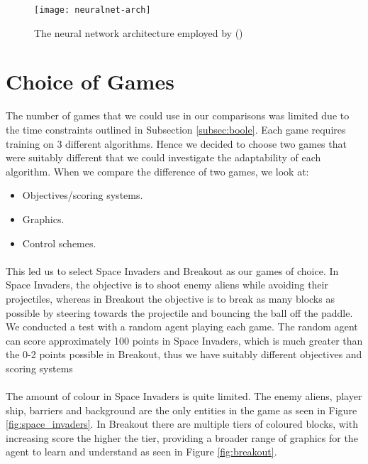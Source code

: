\begin{figure}[h]
    \centering
    \texttt{[image: neuralnet-arch]}
    \caption{The neural network architecture employed by (\citet{human})}
    \label{fig:nnarch}
\end{figure}

\section{Choice of Games} \label{sec:games}
The number of games that we could use in our comparisons was limited due to the time constraints outlined in Subsection \ref{subsec:boole}. Each game requires training on 3 different algorithms. Hence we decided to choose two games that were suitably different that we could investigate the adaptability of each algorithm. When we compare the difference of two games, we look at:

\begin{itemize}
    \item Objectives/scoring systems.
    \item Graphics.
    \item Control schemes.
\end{itemize} \paragraph{}

This led us to select Space Invaders \cite{space-invaders} and Breakout \cite{breakout} as our games of choice. In Space Invaders, the objective is to shoot enemy aliens while avoiding their projectiles, whereas in Breakout the objective is to break as many blocks as possible by steering towards the projectile and bouncing the ball off the paddle. We conducted a test with a random agent playing each game. The random agent can score approximately 100 points in Space Invaders, which is much greater than the 0-2 points possible in Breakout, thus we have suitably different objectives and scoring systems \paragraph{}

The amount of colour in Space Invaders is quite limited. The enemy aliens, player ship, barriers and background are the only entities in the game as seen in Figure \ref{fig:space_invaders}. In Breakout there are multiple tiers of coloured blocks, with increasing score the higher the tier, providing a broader range of graphics for the agent to learn and understand as seen in Figure \ref{fig:breakout}. \paragraph{}

